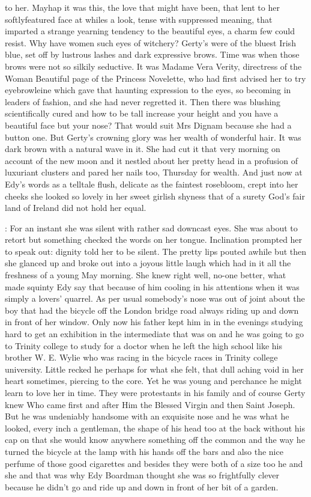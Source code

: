 to her. Mayhap it was this, the love that might have been, that lent to
her softlyfeatured face at whiles a look, tense with suppressed meaning,
that imparted a strange yearning tendency to the beautiful eyes, a charm
few could resist. Why have women such eyes of witchery? Gerty's were of
the bluest Irish blue, set off by lustrous lashes and dark expressive
brows. Time was when those brows were not so silkily seductive. It was
Madame Vera Verity, directress of the Woman Beautiful page of the Princess
Novelette, who had first advised her to try eyebrowleine which gave that
haunting expression to the eyes, so becoming in leaders of fashion, and
she had never regretted it. Then there was blushing scientifically cured
and how to be tall increase your height and you have a beautiful face but
your nose? That would suit Mrs Dignam because she had a button one. But
Gerty's crowning glory was her wealth of wonderful hair. It was dark brown
with a natural wave in it. She had cut it that very morning on account
of the new moon and it nestled about her pretty head in a profusion of
luxuriant clusters and pared her nails too, Thursday for wealth. And just
now at Edy's words as a telltale flush, delicate as the faintest
rosebloom, crept into her cheeks she looked so lovely in her sweet girlish
shyness that of a surety God's fair land of Ireland did not hold
her equal.

:
For an instant she was silent with rather sad downcast eyes. She was
about to retort but something checked the words on her tongue. Inclination
prompted her to speak out: dignity told her to be silent. The pretty lips
pouted awhile but then she glanced up and broke out into a joyous little
laugh which had in it all the freshness of a young May morning. She knew
right well, no-one better, what made squinty Edy say that because of him
cooling in his attentions when it was simply a lovers' quarrel. As per
usual somebody's nose was out of joint about the boy that had the bicycle
off the London bridge road always riding up and down in front of her
window. Only now his father kept him in in the evenings studying
hard to get an exhibition in the intermediate that was on and he was
going to go to Trinity college to study for a doctor when he left
the high school like his brother W. E. Wylie who was racing in the
bicycle races in Trinity college university. Little recked he perhaps
for what she felt, that dull aching void in her heart sometimes,
piercing to the core. Yet he was young and perchance he might
learn to love her in time. They were protestants in his family
and of course Gerty knew Who came first and after Him the Blessed
Virgin and then Saint Joseph. But he was undeniably handsome with an
exquisite nose and he was what he looked, every inch a gentleman, the
shape of his head too at the back without his cap on that she would know
anywhere something off the common and the way he turned the bicycle at
the lamp with his hands off the bars and also the nice perfume of those
good cigarettes and besides they were both of a size too he and she and
that was why Edy Boardman thought she was so frightfully clever because
he didn't go and ride up and down in front of her bit of a garden.

